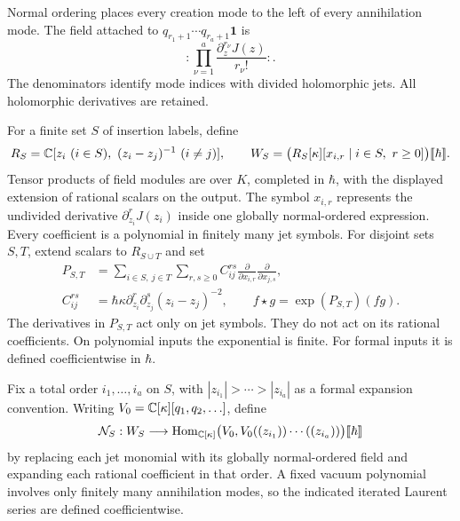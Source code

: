 Normal ordering places every creation mode to the left of every
annihilation mode.  The field attached to
$q_{r_1+1}\cdots q_{r_a+1}\mathbf1$ is
\[
 :\prod_{\nu=1}^a\frac{\partial_z^{r_\nu}J(z)}{r_\nu!}:.
\]
The denominators identify mode indices with divided holomorphic jets.
All holomorphic derivatives are retained.

For a finite set $S$ of insertion labels, define
\[
 R_S=\C[z_i\ (i\in S),\ (z_i-z_j)^{-1}\ (i\ne j)],
 \qquad
 W_S=\bigl(R_S[\kappa][x_{i,r}\mid i\in S,\ r\ge0]\bigr)
            \llbracket\hbar\rrbracket.
\]
Tensor products of field modules are over $K$, completed in $\hbar$,
with the displayed extension of rational scalars on the output.
The symbol $x_{i,r}$ represents the undivided derivative
$\partial_{z_i}^rJ(z_i)$ inside one globally normal-ordered expression.
Every coefficient is a polynomial in finitely many jet symbols.  For disjoint
sets $S,T$, extend scalars to $R_{S\cup T}$ and set
\begin{equation*}
 \begin{split}
 P_{S,T}&=\sum_{i\in S,\ j\in T}\sum_{r,s\ge0}
 C_{ij}^{rs}\frac{\partial}{\partial x_{i,r}}
              \frac{\partial}{\partial x_{j,s}},\\
 C_{ij}^{rs}&=\hbar\kappa\partial_{z_i}^r\partial_{z_j}^s
                    (z_i-z_j)^{-2},\qquad
 f\star g=\exp(P_{S,T})(fg).
 \end{split}
\end{equation*}
The derivatives in $P_{S,T}$ act only on jet symbols.  They do not act on
its rational coefficients.  On polynomial inputs the exponential is finite.
For formal inputs it is defined coefficientwise in $\hbar$.

Fix a total order $i_1,\ldots,i_a$ on $S$, with
$|z_{i_1}|>\cdots>|z_{i_a}|$ as a formal expansion convention.
Writing $V_0=\mathbb C[\kappa][q_1,q_2,\ldots]$, define
\[
 \mathcal N_S:W_S\longrightarrow
 \operatorname{Hom}_{\mathbb C[\kappa]}\bigl(V_0,
 V_0((z_{i_1}))\cdots((z_{i_a}))\bigr)\llbracket\hbar\rrbracket
\]
by replacing each jet monomial with its globally normal-ordered field
and expanding each rational coefficient in that order.  A fixed vacuum
polynomial involves only finitely many annihilation modes, so the indicated
iterated Laurent series are defined coefficientwise.

